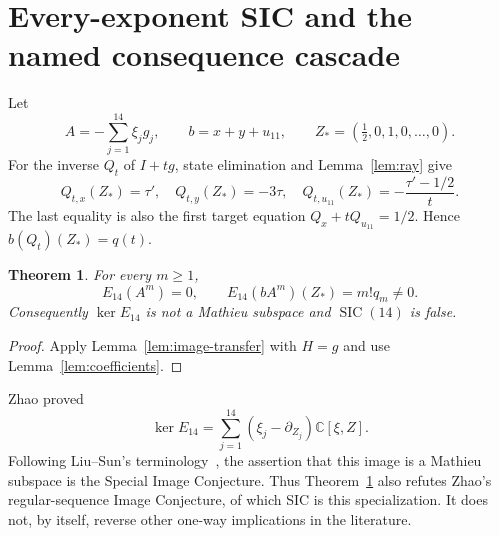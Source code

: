 \documentclass[11pt]{article}
\newtheorem{theorem}{Theorem}
\newcommand{\C}{\mathbb C}
\newcommand{\SIC}{\operatorname{SIC}}
\begin{document}
\section{Every-exponent SIC and the named consequence cascade}

Let
\begin{equation}
 A=-\sum_{j=1}^{14}\xi_jg_j,\qquad b=x+y+u_{11},
 \qquad Z_*=(\tfrac12,0,1,0,\ldots,0).
\end{equation}
For the inverse $Q_t$ of $I+tg$, state elimination and
Lemma~\ref{lem:ray} give
\begin{equation}
 Q_{t,x}(Z_*)=\tau',\quad
 Q_{t,y}(Z_*)=-3\tau,\quad
 Q_{t,u_{11}}(Z_*)=-\frac{\tau'-1/2}{t}.
 \label{eq:qcoordinates}
\end{equation}
The last equality is also the first target equation
$Q_x+tQ_{u_{11}}=1/2$.  Hence $b(Q_t)(Z_*)=q(t)$.

\begin{theorem}\label{thm:sic}
For every $m\ge1$,
\[
 E_{14}(A^m)=0,\qquad
 E_{14}(bA^m)(Z_*)=m!q_m\ne0.
\]
Consequently $\ker E_{14}$ is not a Mathieu subspace and $\SIC(14)$ is
false.
\end{theorem}

\begin{proof}
Apply Lemma~\ref{lem:image-transfer} with $H=g$ and use
Lemma~\ref{lem:coefficients}.
\end{proof}

Zhao proved~\cite{zhao-image}
\[
 \ker E_{14}=\sum_{j=1}^{14}(\xi_j-\partial_{Z_j})\C[\xi,Z].
\]
Following Liu--Sun's terminology~\cite{liusun}, the assertion that this image
is a Mathieu subspace is the Special Image Conjecture.  Thus
Theorem~\ref{thm:sic} also refutes Zhao's regular-sequence Image Conjecture,
of which SIC is this specialization.  It does not, by itself, reverse other
one-way implications in the literature.
\end{document}
